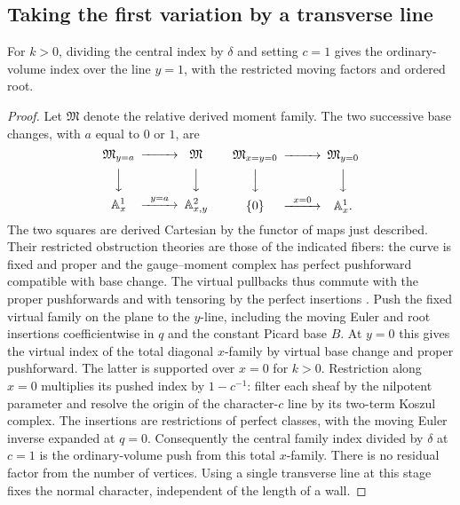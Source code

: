 \subsection{Taking the first variation by a transverse line}

\begin{lemma}\label{lem:basechange}
For $k>0$, dividing the central index by $\delta$ and setting $c=1$
gives the ordinary-volume index over the line $y=1$, with the
restricted moving factors and ordered root.
\end{lemma}
\begin{proof}
Let $\mathfrak M$ denote the relative derived moment family. The two
successive base changes, with $a$ equal to $0$ or $1$, are
\[
\begin{CD}
 \mathfrak M_{y=a}@>>> \mathfrak M\\
 @VVV @VVV\\
 \AAo^1_x @>{y=a}>> \AAo^2_{x,y}
\end{CD}
\qquad
\begin{CD}
 \mathfrak M_{x=y=0}@>>>\mathfrak M_{y=0}\\
 @VVV @VVV\\
 \{0\}@>{x=0}>>\AAo^1_x .
\end{CD}
\]
The two squares are derived Cartesian by the functor of maps just described.
Their restricted obstruction theories are those of the indicated fibers:
the curve is fixed and proper and the gauge--moment complex has
perfect pushforward compatible with base change.
The virtual pullbacks thus commute with the proper pushforwards and
with tensoring by the perfect insertions \cite[Theorem~2.6]{Q}.
Push the fixed virtual family on the plane to the $y$-line, including the moving Euler and root insertions coefficientwise in $q$ and the constant Picard base $B$. At $y=0$ this gives the virtual index of the total diagonal $x$-family by virtual base change and proper pushforward. The latter is supported over $x=0$ for $k>0$. Restriction along $x=0$ multiplies its pushed index by $1-c^{-1}$: filter each sheaf by the nilpotent parameter and resolve the origin of the character-$c$ line by its two-term Koszul complex. The insertions are restrictions of perfect classes, with the moving Euler inverse expanded at $q=0$. Consequently the central family index divided by $\delta$ at $c=1$ is the ordinary-volume push from this total $x$-family. There is no residual factor from the number of vertices. Using a single transverse line at this stage fixes the normal character, independent of the length of a wall.


\end{proof}
